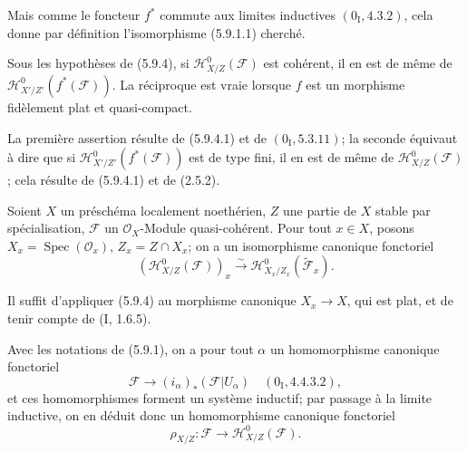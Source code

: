 
Mais comme le foncteur $f^*$ commute aux limites inductives
$(0_{\mathrm I},4.3.2)$, cela donne par définition l'isomorphisme
(5.9.1.1) cherché.

\begin{corollary}[5.9.5]
\label{IV.2.s5.9.5-fr}
Sous les hypothèses de (5.9.4), si
$\mathcal H^0_{X/Z}(\mathcal F)$ est cohérent, il en est de même de
$\mathcal H^0_{X'/Z'}(f^*(\mathcal F))$. La réciproque est vraie lorsque
$f$ est un morphisme fidèlement plat et quasi-compact.
\end{corollary}

La première assertion résulte de (5.9.4.1) et de $(0_{\mathrm I},5.3.11)$;
la seconde équivaut à dire que si
$\mathcal H^0_{X'/Z'}(f^*(\mathcal F))$ est de type fini, il en est de même
de $\mathcal H^0_{X/Z}(\mathcal F)$; cela résulte de (5.9.4.1) et de
(2.5.2).

\begin{corollary}[5.9.6]
\label{IV.2.s5.9.6-fr}
Soient $X$ un préschéma localement noethérien, $Z$ une partie de $X$ stable
par spécialisation, $\mathcal F$ un $\mathcal O_X$-Module quasi-cohérent.
Pour tout $x\in X$, posons $X_x=\operatorname{Spec}(\mathcal O_x)$,
$Z_x=Z\cap X_x$; on a un isomorphisme canonique fonctoriel
\begin{equation}
(\mathcal H^0_{X/Z}(\mathcal F))_x
\xrightarrow{\sim}\mathcal H^0_{X_x/Z_x}(\widetilde{\mathcal F}_x).
\tag{5.9.6.1}\label{IV.2.s5.9.6.1-fr}
\end{equation}
\end{corollary}

Il suffit d'appliquer (5.9.4) au morphisme canonique $X_x\to X$, qui est
plat, et de tenir compte de (I, 1.6.5).

\begin{env}[5.9.7]
\label{IV.2.s5.9.7-fr}
Avec les notations de (5.9.1), on a pour tout $\alpha$ un homomorphisme
canonique fonctoriel
\[
\mathcal F\longrightarrow(i_\alpha)_*(\mathcal F|U_\alpha)
\quad(0_{\mathrm I},4.4.3.2),
\]
et ces homomorphismes forment un système inductif; par passage à la limite
inductive, on en déduit donc un homomorphisme canonique fonctoriel
\begin{equation}
\rho_{X/Z}:\mathcal F\longrightarrow\mathcal H^0_{X/Z}(\mathcal F).
\tag{5.9.7.1}\label{IV.2.s5.9.7.1-fr}
\end{equation}
\end{env}

